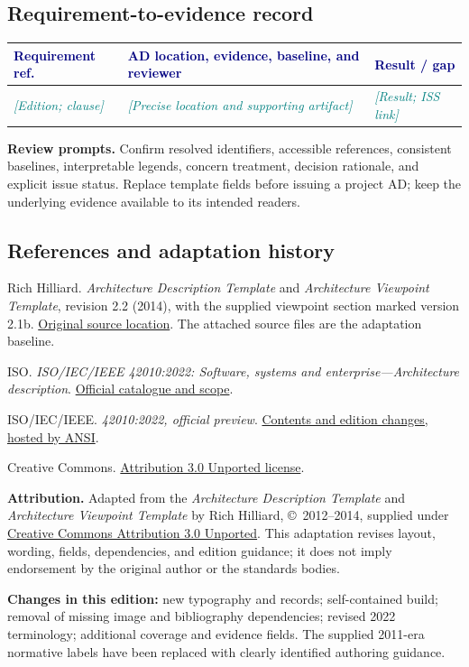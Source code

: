 \documentclass[11pt,letterpaper]{article}
\newcommand{\FillIn}[1]{\textcolor{Teal}{\sffamily\itshape[#1]}}
\newcommand{\TableHead}[1]{\textcolor{Navy}{\sffamily\bfseries#1}}
\newcommand{\TemplateAttribution}{%
  \textbf{Attribution.} Adapted from the \emph{Architecture Description Template}
  and \emph{Architecture Viewpoint Template} by Rich Hilliard,
  \copyright\ 2012--2014, supplied under
  \href{https://creativecommons.org/licenses/by/3.0/}{Creative Commons Attribution 3.0 Unported}.
  This adaptation revises layout, wording, fields, dependencies, and edition guidance;
  it does not imply endorsement by the original author or the standards bodies.}
\newcommand{\TemplateSources}{%
  {\small
  \begin{enumerate}[label={[\arabic*]},leftmargin=1.6em,itemsep=6pt]
  \item Rich Hilliard. \emph{Architecture Description Template} and
  \emph{Architecture Viewpoint Template}, revision 2.2 (2014), with the supplied
  viewpoint section marked version 2.1b.
  \href{http://www.iso-architecture.org/42010/templates/}{Original source location}.
  The attached source files are the adaptation baseline.
  \item ISO. \emph{ISO/IEC/IEEE 42010:2022: Software, systems and enterprise---Architecture description}.
  \href{https://www.iso.org/standard/74393.html}{Official catalogue and scope}.
  \item ISO/IEC/IEEE. \emph{42010:2022, official preview}.
  \href{https://webstore.ansi.org/preview-pages/iso/preview_iso\%2Biec\%2Bieee\%2B42010-2022.pdf}{Contents and edition changes, hosted by ANSI}.
  \item Creative Commons. \href{https://creativecommons.org/licenses/by/3.0/}{Attribution 3.0 Unported license}.
  \end{enumerate}}}
\begin{document}
\subsection{Requirement-to-evidence record}
{\small
\begin{tabularx}{\linewidth}{@{}L{1.04in}Y L{1.17in}@{}}
\toprule
\TableHead{Requirement ref.} & \TableHead{AD location, evidence, baseline, and reviewer} & \TableHead{Result / gap}\\
\midrule
\FillIn{Edition; clause} & \FillIn{Precise location and supporting artifact} & \FillIn{Result; ISS link}\\
\bottomrule
\end{tabularx}}

\textbf{Review prompts.} Confirm resolved identifiers, accessible references,
consistent baselines, interpretable legends, concern treatment, decision rationale,
and explicit issue status. Replace template fields before issuing a project AD;
keep the underlying evidence available to its intended readers.

\subsection{References and adaptation history}
\TemplateSources
{\footnotesize\color{Muted}\TemplateAttribution\par
\textbf{Changes in this edition:} new typography and records; self-contained build;
removal of missing image and bibliography dependencies; revised 2022 terminology;
additional coverage and evidence fields. The supplied 2011-era normative labels
have been replaced with clearly identified authoring guidance.\par}
\end{document}
